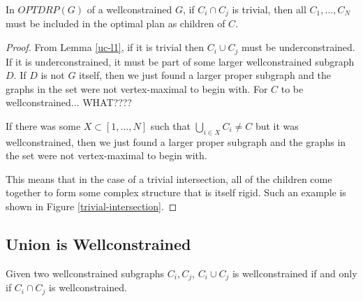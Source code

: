 \documentclass[11pt]{article}
\begin{document}
\begin{theorem}\label{uc-t1}

In $OPTDRP(G)$ of a wellconstrained $G$, if $C_i \cap C_j$ is trivial, then all $C_1,\ldots, C_N$ must be included in the optimal plan as children of $C$.
\end{theorem}

\begin{proof}
From Lemma \ref{uc-l1}, if it is trivial then $C_i \cup C_j$ must be underconstrained. If it is underconstrained, it must be part of some larger wellconstrained subgraph $D$. If $D$ is not $G$ itself, then we just found a larger proper subgraph and the graphs in the set were not vertex-maximal to begin with.
 For $C$ to be wellconstrained... WHAT????

If there was some $X\subset [1,\ldots,N]$ such that $\bigcup_{i\in X}{C_i}\neq C$ but it was wellconstrained, then we just found a larger proper subgraph and the graphs in the set were not vertex-maximal to begin with.

This means that in the case of a trivial intersection, all of the children come together to form some complex structure that is itself rigid. Such an example is shown in Figure \ref{trivial-intersection}.
\end{proof}








\subsection{Union is Wellconstrained}

\begin{lemma}
Given two wellconstrained subgraphs $C_i,C_j$, $C_i\cup C_j$ is wellconstrained if and only if $C_i\cap C_j$ is wellconstrained.
\end{lemma}
\end{document}
